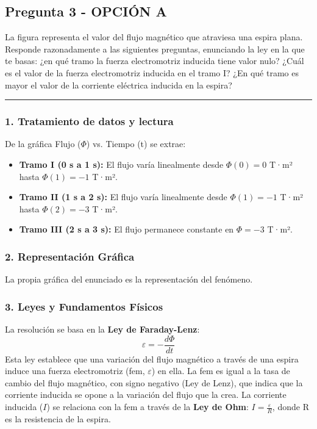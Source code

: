 \subsection{Pregunta 3 - OPCIÓN A}
\label{subsec:3A_2025_jun_res}

\begin{cajaenunciado}
La figura representa el valor del flujo magnético que atraviesa una espira plana. Responde razonadamente a las siguientes preguntas, enunciando la ley en la que te basas: ¿en qué tramo la fuerza electromotriz inducida tiene valor nulo? ¿Cuál es el valor de la fuerza electromotriz inducida en el tramo I? ¿En qué tramo es mayor el valor de la corriente eléctrica inducida en la espira?
\end{cajaenunciado}
\hrule

\subsubsection*{1. Tratamiento de datos y lectura}
De la gráfica Flujo ($\Phi$) vs. Tiempo (t) se extrae:
\begin{itemize}
    \item \textbf{Tramo I (0 s a 1 s):} El flujo varía linealmente desde $\Phi(0)=0$ T·m² hasta $\Phi(1)=-1$ T·m².
    \item \textbf{Tramo II (1 s a 2 s):} El flujo varía linealmente desde $\Phi(1)=-1$ T·m² hasta $\Phi(2)=-3$ T·m².
    \item \textbf{Tramo III (2 s a 3 s):} El flujo permanece constante en $\Phi=-3$ T·m².
\end{itemize}

\subsubsection*{2. Representación Gráfica}
La propia gráfica del enunciado es la representación del fenómeno.

\subsubsection*{3. Leyes y Fundamentos Físicos}
La resolución se basa en la \textbf{Ley de Faraday-Lenz}:
$$ \varepsilon = - \frac{d\Phi}{dt} $$
Esta ley establece que una variación del flujo magnético a través de una espira induce una fuerza electromotriz (fem, $\varepsilon$) en ella. La fem es igual a la tasa de cambio del flujo magnético, con signo negativo (Ley de Lenz), que indica que la corriente inducida se opone a la variación del flujo que la crea.
La corriente inducida ($I$) se relaciona con la fem a través de la \textbf{Ley de Ohm}: $I = \frac{\varepsilon}{R}$, donde R es la resistencia de la espira.


